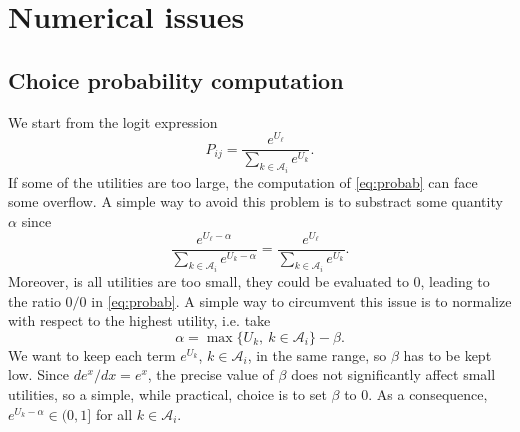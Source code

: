 \chapter{Numerical issues}
\label{chap:num}

\section{Choice probability computation}

We start from the logit expression
\begin{equation}
P_{ij} = \frac{e^{U_{\ell}}}{\sum_{k \in \mathcal{A}_i} e^{U_k}}.
\label{eq:probab}
\end{equation}
If some of the utilities are too large, the computation of
\eqref{eq:probab} can face some overflow.
A simple way to avoid this problem is to substract some quantity
$\alpha$ since
\[
\frac{e^{U_{\ell}-\alpha}}{\sum_{k \in \mathcal{A}_i} e^{U_k-\alpha}}
= \frac{e^{U_{\ell}}}{\sum_{k \in \mathcal{A}_i} e^{U_k}}.
\] 
Moreover, is all utilities are too small, they could be evaluated to
0, leading to the ratio $0/0$ in \eqref{eq:probab}.
A simple way to circumvent this issue is to normalize with respect to
the highest utility, i.e. take
\[
\alpha = \max \lbrace U_k,\ k \in \mathcal{A}_i \rbrace - \beta.
\]
We want to keep each term $e^{U_k}$, $k \in \mathcal{A}_i$, in the
same range, so $\beta$ has to be kept low.
Since $d e^x/dx = e^x$, the precise value of $\beta$ does not
significantly affect small utilities, so a simple, while practical,
choice is to set $\beta$ to 0.
As a consequence, $e^{U_k - \alpha} \in (0,1]$ for all $k \in \mathcal{A}_i$.
